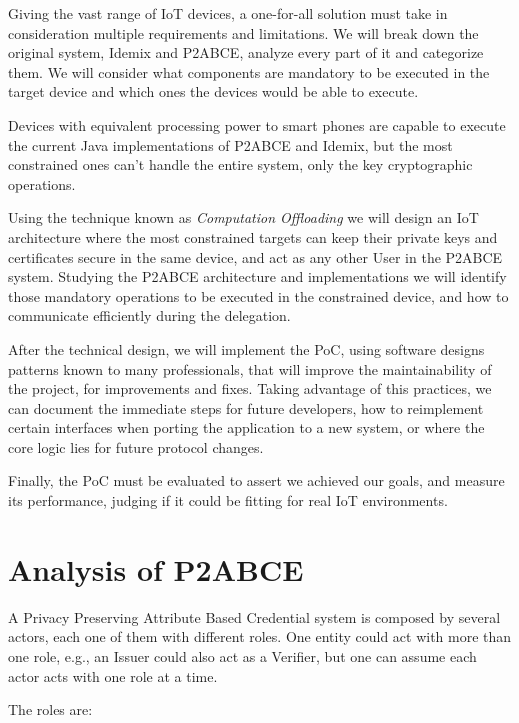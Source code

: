 Giving the vast range of IoT devices, a one-for-all solution must take in consideration multiple requirements and limitations. We will break down the original system, Idemix and P2ABCE, analyze every part of it and categorize them. We will consider what components are mandatory to be executed in the target device and which ones the devices would be able to execute.

Devices with equivalent processing power to smart phones are capable to execute the current Java implementations of P2ABCE and Idemix, but the most constrained ones can't handle the entire system, only the key cryptographic operations.

Using the technique known as \textit{Computation Offloading} we will design an IoT architecture where the most constrained targets can keep their private keys and certificates secure in the same device, and act as any other User in the P2ABCE system. Studying the P2ABCE architecture and implementations we will identify those mandatory operations to be executed in the constrained device, and how to communicate efficiently during the delegation.

After the technical design, we will implement the PoC, using software designs patterns known to many professionals, that will improve the maintainability of the project, for improvements and fixes. Taking advantage of this practices, we can document the immediate steps for future developers, how to reimplement certain interfaces when porting the application to a new system, or where the core logic lies for future protocol changes.

Finally, the PoC must be evaluated to assert we achieved our goals, and measure its performance, judging if it could be fitting for real IoT environments.



\section{Analysis of P2ABCE}

A Privacy Preserving Attribute Based Credential system is composed by several actors, each one of them with different roles. One entity could act with more than one role, e.g., an Issuer could also act as a Verifier, but one can assume each actor acts with one role at a time.


The roles are:


